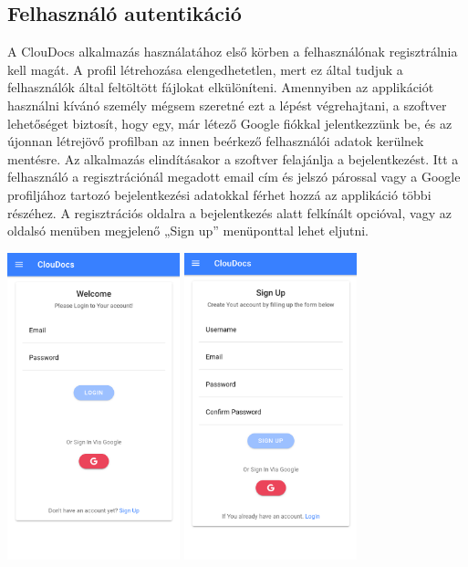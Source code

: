 \documentclass[12pt, twoside]{report}
\begin{document}
\subsection{Felhasználó autentikáció}
A ClouDocs alkalmazás használatához első körben a felhasználónak regisztrálnia kell magát. A profil létrehozása elengedhetetlen, mert ez által tudjuk a felhasználók által feltöltött fájlokat elkülöníteni. Amennyiben az applikációt használni kívánó személy mégsem szeretné ezt a lépést végrehajtani, a szoftver lehetőséget biztosít, hogy egy, már létező Google fiókkal jelentkezzünk be, és az újonnan létrejövő profilban az innen beérkező felhasználói adatok kerülnek mentésre. Az alkalmazás elindításakor a szoftver felajánlja a bejelentkezést. Itt a felhasználó a regisztrációnál megadott email cím és jelszó párossal vagy a Google profiljához tartozó bejelentkezési adatokkal férhet hozzá az applikáció többi részéhez. A regisztrációs oldalra a bejelentkezés alatt felkínált opcióval, vagy az oldalsó menüben megjelenő „Sign up” menüponttal lehet eljutni.

\begin{center}
	\includegraphics[width=50mm,scale=0.5,]{login.png}
	\includegraphics[width=50mm,scale=0.5,]{registration.png}
\end{center}
\end{document}
